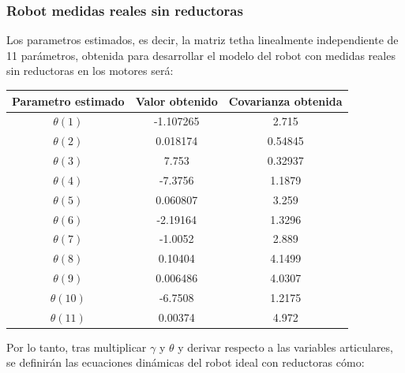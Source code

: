 \subsubsection{Robot medidas reales sin reductoras}
Los parametros estimados, es decir, la matriz tetha linealmente independiente de 11 parámetros, obtenida para desarrollar el modelo del robot con medidas reales sin reductoras en los motores será:
\begin{center}
	\begin{tabular}{| c | c | c |}

		\hline
		Parametro estimado & Valor obtenido & Covarianza obtenida \\
		\hline
		$\theta(1) $ & -1.107265 & 2.715 \\
		\hline
		$\theta(2) $ & 0.018174 & 0.54845 \\
		\hline
		$\theta(3) $ & 7.753 & 0.32937 \\
		\hline
		$\theta(4) $ & -7.3756 & 1.1879 \\
		\hline
		$\theta(5) $ & 0.060807 & 3.259 \\
		\hline
		$\theta(6) $ & -2.19164 & 1.3296 \\
		\hline
		$\theta(7) $ & -1.0052 & 2.889 \\
		\hline
		$\theta(8) $ & 0.10404 & 4.1499 \\
		\hline
		$\theta(9) $ & 0.006486 & 4.0307 \\
		\hline
		$\theta(10) $ & -6.7508 & 1.2175 \\
		\hline
		$\theta(11) $ & 0.00374 & 4.972 \\
		\hline
	\end{tabular}
\end{center}
Por lo tanto, tras multiplicar $\gamma$ y $\theta$ y derivar respecto a las variables articulares, se definirán las ecuaciones dinámicas del robot ideal con reductoras cómo:\\
